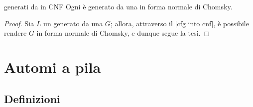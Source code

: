 \documentclass[a4paper, 12pt]{report}
\begin{document}
    \begin{framedcor}{\CFL generati da \CFG in CNF}
        Ogni \CFL è generato da una \CFG in forma normale di Chomsky.
    \end{framedcor}

    \begin{proof}
        Sia $L$ un \CFL generato da una \CFG $G$; allora, attraverso il \cref{cfg into cnf}, è possibile rendere $G$ in forma normale di Chomsky, e dunque segue la tesi.
    \end{proof}

    \section{Automi a pila}

    \subsection{Definizioni}
\end{document}
